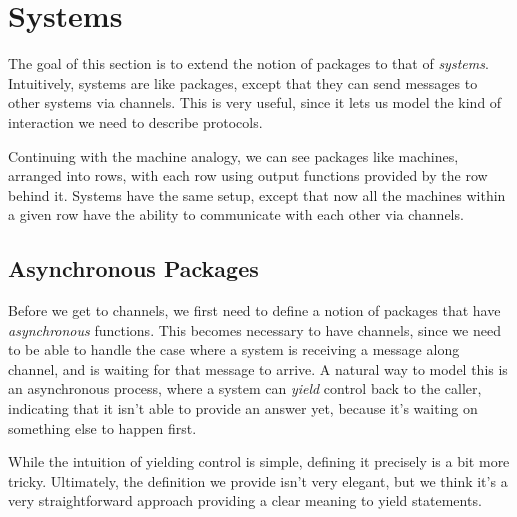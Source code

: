 \section{Systems}

The goal of this section is to extend the notion of packages
to that of \emph{systems}.
Intuitively, systems are like packages, except that they can send
messages to other systems via channels.
This is very useful, since it lets us model the kind of interaction
we need to describe protocols.

Continuing with the machine analogy, we can see packages like machines,
arranged into rows, with each row using output functions
provided by the row behind it.
Systems have the same setup, except that now all the machines within
a given row have the ability to communicate with each other via channels.

\subsection{Asynchronous Packages}

Before we get to channels, we first need to define a notion
of packages that have \emph{asynchronous} functions.
This becomes necessary to have channels, since we need to be
able to handle the case where a system is receiving a message along
channel, and is waiting for that message to arrive.
A natural way to model this is an asynchronous process,
where a system can \emph{yield} control back to the caller,
indicating that it isn't able to provide an answer yet,
because it's waiting on something else to happen first.

While the intuition of yielding control is simple, defining
it precisely is a bit more tricky.
Ultimately, the definition we provide isn't very elegant,
but we think it's a very straightforward approach
providing a clear meaning to yield statements.

